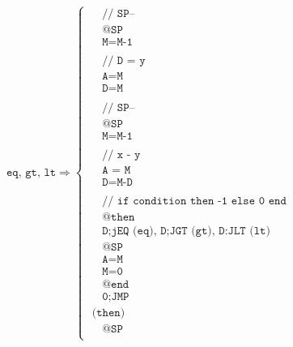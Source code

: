 \documentclass[a4paper]{book}
\begin{document}
\[
    \texttt{eq, gt, lt}
    \Rightarrow
    \begin{cases}
        ~ ~ ~ ~\texttt{ // SP--                             } \\
        ~ ~ ~ ~\texttt{ @SP                                 } \\
        ~ ~ ~ ~\texttt{ M=M-1                               } \\
        ~ ~ ~ ~\\
        ~ ~ ~ ~\texttt{ // D = y                            } \\
        ~ ~ ~ ~\texttt{ A=M                                 } \\
        ~ ~ ~ ~\texttt{ D=M                                 } \\
        ~ ~ ~ ~\\
        ~ ~ ~ ~\texttt{ // SP--                             } \\
        ~ ~ ~ ~\texttt{ @SP                                 } \\
        ~ ~ ~ ~\texttt{ M=M-1                               } \\
        ~ ~ ~ ~\\
        ~ ~ ~ ~\texttt{ // x - y                            } \\
        ~ ~ ~ ~\texttt{ A = M                               } \\
        ~ ~ ~ ~\texttt{ D=M-D                               } \\
        ~ ~ ~ ~\\
        ~ ~ ~ ~\texttt{ // if condition then -1 else 0 end  } \\
        ~ ~ ~ ~\texttt{ @then                               } \\
        ~ ~ ~ ~\texttt{ D;jEQ (eq),  D;JGT (gt), D:JLT (lt) } \\
        ~ ~ ~ ~\texttt{ @SP                                 } \\
        ~ ~ ~ ~\texttt{ A=M                                 } \\
        ~ ~ ~ ~\texttt{ M=0                                 } \\
        ~ ~ ~ ~\texttt{ @end                                } \\
        ~ ~ ~ ~\texttt{ 0;JMP                               } \\
        \texttt{ (then)                                     } \\
        ~ ~ ~ ~\texttt{ @SP                                 } \\

\end{cases}\]
\end{document}
